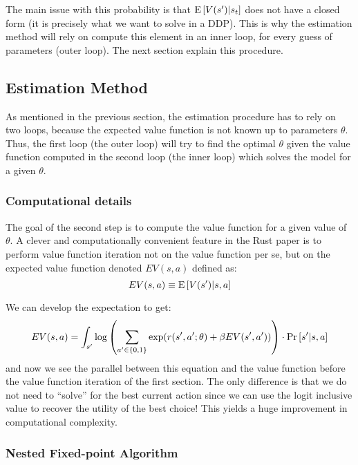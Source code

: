 The main issue with this probability is that $\operatorname{E}\left[ V(s') | s_t \right]$ does not have a closed form (it is precisely what we want to solve in a DDP). This is why the estimation method will rely on compute this element in an inner loop, for every guess of parameters (outer loop). The next section explain this procedure.

\subsection{Estimation Method}

As mentioned in the previous section, the estimation procedure has to rely on two loops, because the expected value function is not known up to parameters $\theta$. Thus, the first loop (the outer loop) will try to find the optimal $\theta$ given the value function computed in the second loop (the inner loop) which solves the model for a given $\theta$.

\subsubsection{Computational details}

The goal of the second step is to compute the value function for a given value of $\theta$. A clever and computationally convenient feature in the Rust paper is to perform value function iteration not on the value function per se, but on the expected value function denoted $EV(s, a)$ defined as: $$ EV(s, a) \equiv \operatorname{E}\left[ V(s') | s, a \right] $$

We can develop the expectation to get: $$EV(s, a) = \int_{s'} \log \left( \sum_{a' \in \{0, 1\}} \exp( r( s', a'; \theta) + \beta EV(s', a') ) \right) \cdot \operatorname{Pr}\left[s'|s, a\right] $$
and now we see the parallel between this equation and the value function before the value function iteration of the first section. The only difference is that we do not need to ``solve'' for the best current action since we can use the logit inclusive value to recover the utility of the best choice! This yields a huge improvement in computational complexity.

\subsubsection{Nested Fixed-point Algorithm}


